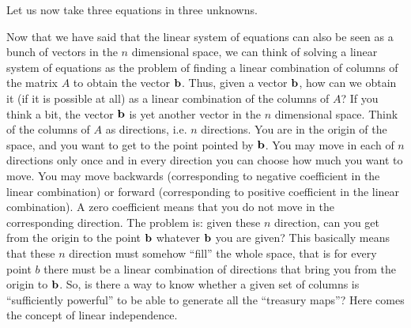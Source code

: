 \documentclass[computationalMathematics.tex]{subfiles}
\begin{document}
\begin{example}
    Let us now take three equations in three unknowns.
\end{example}

\par Now that we have said that the linear system of equations can also be seen as a bunch of vectors in the $n$ dimensional space, we can think of solving a linear system of equations as the problem of finding a linear combination of columns of the matrix $A$ to obtain the vector ${\bf b }$. Thus, given a vector ${\bf b }$, how can we obtain it (if it is possible at all) as a linear combination of the columns of $A$? If you think a bit, the vector ${\bf b }$ is yet another vector in the $n$ dimensional space. Think of the columns of $A$ as directions, i.e. $n$ directions. You are in the origin of the space, and you want to get to the point pointed by ${\bf b }$. You may move in each of $n$ directions only once and in every direction you can choose how much you want to move. You may move backwards (corresponding to negative coefficient in the linear combination) or forward (corresponding to positive coefficient in the linear combination). A zero coefficient means that you do not move in the corresponding direction. The problem is: given these $n$ direction, can you get from the origin to the point ${\bf b }$ whatever ${\bf b }$ you are given? This basically means that these $n$ direction must somehow ``fill'' the whole space, that is for every point $b$ there must be a linear combination of directions that bring you from the origin to ${\bf b }$. So, is there a way to know whether a given set of columns is ``sufficiently powerful'' to be able to generate all the ``treasury maps''? Here comes the concept of linear independence.
\end{document}
